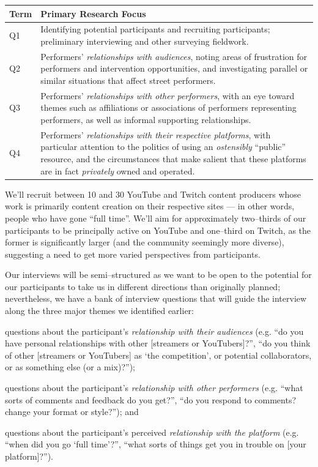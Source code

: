 \documentclass[10pt]{article}
\begin{document}
\noindent\begin{tabular}{p{.5in}|p{5.5in}}
  \textbf{Term} & \textbf{Primary Research Focus} \\
\hline
Q1  & Identifying potential participants and recruiting participants;
      preliminary interviewing and other surveying fieldwork. \\
\hline
Q2  & Performers' \textit{relationships with audiences},
      noting areas of frustration for performers and intervention opportunities, and
      investigating parallel or similar situations that affect street performers. \\
\hline
Q3  & Performers' \textit{relationships with other performers},
      with an eye toward themes such as affiliations or associations of performers representing performers,
      as well as informal supporting relationships. \\
\hline
Q4  & Performers' \textit{relationships with their respective platforms},
      with particular attention to the politics of using an \textit{ostensibly} ``public'' resource,
      and the circumstances that make salient that these platforms are in fact \textit{privately} owned and operated.
\end{tabular}

\vspace*{5pt}

We'll recruit between 10 and 30 YouTube and Twitch content producers whose work is primarily content creation on their respective sites
--- in other words, people who have gone ``full time''.
We'll aim for approximately two--thirds of our participants to be principally active on YouTube and one--third on Twitch, as
the former is significantly larger (and the community seemingly more diverse), suggesting
a need to get more varied perspectives from participants.

Our interviews will be semi--structured as
we want to be open to the potential for our participants to take us in different directions than originally planned;
nevertheless, we have a bank of interview questions that will
guide the interview along the three major themes we identified earlier:
\begin{inlinelist}
  \item questions about the participant's \textit{relationship with their audiences}
        (e.g. ``do you have personal relationships with other [streamers or YouTubers]?'',
              ``do you think of other [streamers or YouTubers] as `the competition', or potential collaborators, or as something else (or a mix)?'');
  \item questions about the participant's \textit{relationship with other performers}
        (e.g. ``what sorts of comments and feedback do you get?'',
              ``do you respond to comments? change your format or style?''); and
  \item questions about the participant's perceived \textit{relationship with the platform}
        (e.g. ``when did you go `full time'?'',
              ``what sorts of things get you in trouble on [your platform]?'').
\end{inlinelist}
\end{document}
